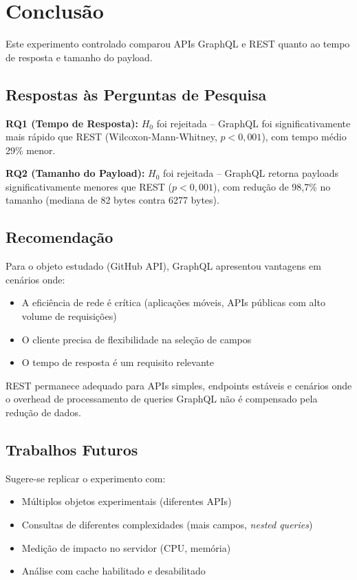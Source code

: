 \section{Conclusão}

Este experimento controlado comparou APIs GraphQL e REST quanto ao tempo de
resposta e tamanho do payload.

\subsection{Respostas às Perguntas de Pesquisa}

\textbf{RQ1 (Tempo de Resposta):} $H_0$ foi rejeitada -- GraphQL foi
significativamente mais rápido que REST (Wilcoxon-Mann-Whitney,
$p < 0,001$), com tempo médio 29\% menor.

\textbf{RQ2 (Tamanho do Payload):} $H_0$ foi rejeitada -- GraphQL retorna
payloads significativamente menores que REST ($p < 0,001$), com redução
de 98,7\% no tamanho (mediana de 82 bytes contra 6277 bytes).

\subsection{Recomendação}

Para o objeto estudado (GitHub API), GraphQL apresentou vantagens em cenários onde:
\begin{itemize}
    \item A eficiência de rede é crítica (aplicações móveis, APIs públicas
          com alto volume de requisições)
    \item O cliente precisa de flexibilidade na seleção de campos
    \item O tempo de resposta é um requisito relevante
\end{itemize}
REST permanece adequado para APIs simples, endpoints estáveis e cenários
onde o overhead de processamento de queries GraphQL não é compensado pela
redução de dados.

\subsection{Trabalhos Futuros}

Sugere-se replicar o experimento com:
\begin{itemize}
    \item Múltiplos objetos experimentais (diferentes APIs)
    \item Consultas de diferentes complexidades (mais campos, \emph{nested queries})
    \item Medição de impacto no servidor (CPU, memória)
    \item Análise com cache habilitado e desabilitado
\end{itemize}
